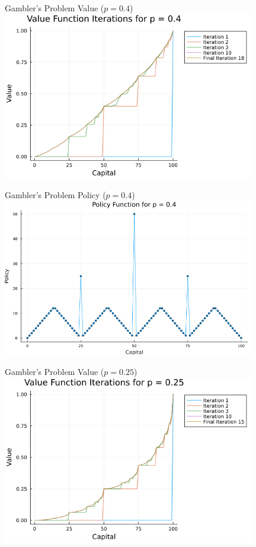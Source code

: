 \documentclass{beamer}
\begin{document}
\begin{frame}{Gambler's Problem Value ($p = 0.4$)}
	\includegraphics[width=11cm]{gamblers_problem_value_p04.png}
\end{frame}
\begin{frame}{Gambler's Problem Policy ($p = 0.4$)}
	\includegraphics[width=11cm]{gamblers_problem_policy_p04.png}
\end{frame}
\begin{frame}{Gambler's Problem Value ($p = 0.25$)}
	\includegraphics[width=11cm]{gamblers_problem_value_p025.png}
\end{frame}
\end{document}
